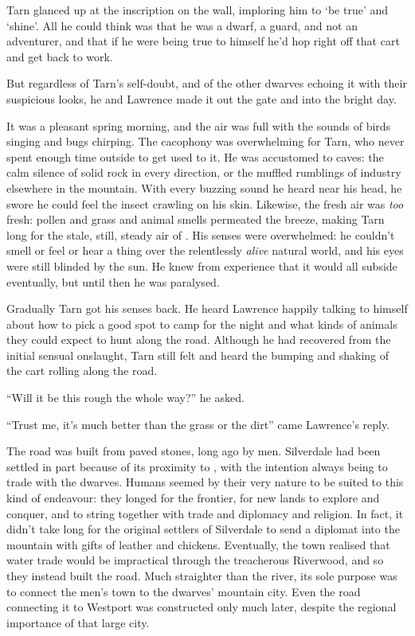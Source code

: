 Tarn glanced up at the inscription on the wall, imploring him to `be true' and `shine'.  All he could think was that he was a dwarf, a guard, and not an adventurer, and that if he were being true to himself he'd hop right off that cart and get back to work.  

But regardless of Tarn's self-doubt, and of the other dwarves echoing it with their suspicious looks, he and Lawrence made it out the gate and into the bright day.

It was a pleasant spring morning, and the air was full with the sounds of birds singing and bugs chirping.  The cacophony was overwhelming for Tarn, who never spent enough time outside to get used to it.  He was accustomed to caves: the calm silence of solid rock in every direction, or the muffled rumblings of industry elsewhere in the mountain.  With every buzzing sound he heard near his head, he swore he could feel the insect crawling on his skin.  Likewise, the fresh air was \emph{too} fresh: pollen and grass and animal smells permeated the breeze, making Tarn long for the stale, still, steady air of \korbarthrond.  His senses were overwhelmed: he couldn't smell or feel or hear a thing over the relentlessly \emph{alive} natural world, and his eyes were still blinded by the sun.  He knew from experience that it would all subside eventually, but until then he was paralysed.

Gradually Tarn got his senses back.  He heard Lawrence happily talking to himself about how to pick a good spot to camp for the night and what kinds of animals they could expect to hunt along the road.  Although he had recovered from the initial sensual onslaught, Tarn still felt and heard the bumping and shaking of the cart rolling along the road.

``Will it be this rough the whole way?'' he asked.

``Trust me, it's much better than the grass or the dirt'' came Lawrence's reply.

The road was built from paved stones, long ago by men.  Silverdale had been settled in part because of its proximity to \korbarthrond, with the intention always being to trade with the dwarves.  Humans seemed by their very nature to be suited to this kind of endeavour: they longed for the frontier, for new lands to explore and conquer, and to string together with trade and diplomacy and religion.  In fact, it didn't take long for the original settlers of Silverdale to send a diplomat into the mountain with gifts of leather and chickens.  Eventually, the town realised that water trade would be impractical through the treacherous Riverwood, and so they instead built the road.  Much straighter than the river, its sole purpose was to connect the men's town to the dwarves' mountain city.  Even the road connecting it to Westport was constructed only much later, despite the regional importance of that large city.

